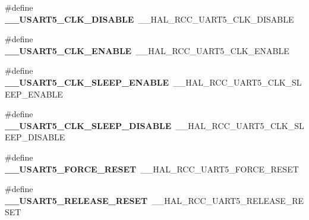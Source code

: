 \begin{DoxyCompactItemize}
\item 
\mbox{\label{group___h_a_l___r_c_c___aliased_gadca81993c4e9a134d292ee509f2108da}} 
\#define {\bfseries \+\_\+\+\_\+\+U\+S\+A\+R\+T5\+\_\+\+C\+L\+K\+\_\+\+D\+I\+S\+A\+B\+LE}~\+\_\+\+\_\+\+H\+A\+L\+\_\+\+R\+C\+C\+\_\+\+U\+A\+R\+T5\+\_\+\+C\+L\+K\+\_\+\+D\+I\+S\+A\+B\+LE
\item 
\mbox{\label{group___h_a_l___r_c_c___aliased_gad959221f7e570f55a18bc2bf2e849b06}} 
\#define {\bfseries \+\_\+\+\_\+\+U\+S\+A\+R\+T5\+\_\+\+C\+L\+K\+\_\+\+E\+N\+A\+B\+LE}~\+\_\+\+\_\+\+H\+A\+L\+\_\+\+R\+C\+C\+\_\+\+U\+A\+R\+T5\+\_\+\+C\+L\+K\+\_\+\+E\+N\+A\+B\+LE
\item 
\mbox{\label{group___h_a_l___r_c_c___aliased_gab2e735cf263fe2d66068649c893f9421}} 
\#define {\bfseries \+\_\+\+\_\+\+U\+S\+A\+R\+T5\+\_\+\+C\+L\+K\+\_\+\+S\+L\+E\+E\+P\+\_\+\+E\+N\+A\+B\+LE}~\+\_\+\+\_\+\+H\+A\+L\+\_\+\+R\+C\+C\+\_\+\+U\+A\+R\+T5\+\_\+\+C\+L\+K\+\_\+\+S\+L\+E\+E\+P\+\_\+\+E\+N\+A\+B\+LE
\item 
\mbox{\label{group___h_a_l___r_c_c___aliased_ga3ebcd8aa43ec53601b15d7ddd88c7a5f}} 
\#define {\bfseries \+\_\+\+\_\+\+U\+S\+A\+R\+T5\+\_\+\+C\+L\+K\+\_\+\+S\+L\+E\+E\+P\+\_\+\+D\+I\+S\+A\+B\+LE}~\+\_\+\+\_\+\+H\+A\+L\+\_\+\+R\+C\+C\+\_\+\+U\+A\+R\+T5\+\_\+\+C\+L\+K\+\_\+\+S\+L\+E\+E\+P\+\_\+\+D\+I\+S\+A\+B\+LE
\item 
\mbox{\label{group___h_a_l___r_c_c___aliased_gaebc2c005ab8b9526cc9d9aa8d2fbc99d}} 
\#define {\bfseries \+\_\+\+\_\+\+U\+S\+A\+R\+T5\+\_\+\+F\+O\+R\+C\+E\+\_\+\+R\+E\+S\+ET}~\+\_\+\+\_\+\+H\+A\+L\+\_\+\+R\+C\+C\+\_\+\+U\+A\+R\+T5\+\_\+\+F\+O\+R\+C\+E\+\_\+\+R\+E\+S\+ET
\item 
\mbox{\label{group___h_a_l___r_c_c___aliased_gaef0270121b0ce4da2cf3f994458326ef}} 
\#define {\bfseries \+\_\+\+\_\+\+U\+S\+A\+R\+T5\+\_\+\+R\+E\+L\+E\+A\+S\+E\+\_\+\+R\+E\+S\+ET}~\+\_\+\+\_\+\+H\+A\+L\+\_\+\+R\+C\+C\+\_\+\+U\+A\+R\+T5\+\_\+\+R\+E\+L\+E\+A\+S\+E\+\_\+\+R\+E\+S\+ET
\item 
\mbox{\label{group___h_a_l___r_c_c___aliased_gaaf4f90ed2401b149fbda79ca0d8bc141}} 

\end{DoxyCompactItemize}
